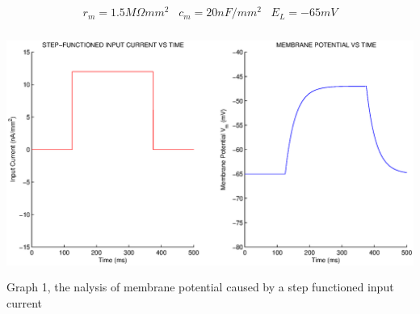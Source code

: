 \documentclass{article}
\begin{document}
\begin{equation*}
r_{m}=1.5 M \Omega mm^{2}\,\,\,\,\,c_{m}=20nF/mm^{2}\,\,\,\,\,E_{L}=-65mV
\end{equation*}

\begin{center}
 \includegraphics[width=150mm, height=80mm, bb=0   231   682   610]{Exercise3/q7.eps}
Graph 1, the nalysis of membrane potential caused by a step functioned input current
\end{center}
\end{document}
